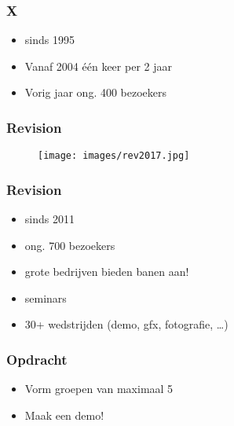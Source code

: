 \documentclass[aspectratio=43]{uva-inf-presentation}
\begin{document}

\begin{frame}
\frametitle{X}

\begin{itemize}
\item sinds 1995
\item Vanaf 2004 \'e\'en keer per 2 jaar
\item Vorig jaar ong. 400 bezoekers
\end{itemize}

\end{frame}


\begin{frame}
\frametitle{Revision}

\begin{figure}
\texttt{[image: images/rev2017.jpg]}
\end{figure}

\end{frame}


\begin{frame}
\frametitle{Revision}

\begin{itemize}
\item sinds 2011
\item ong. 700 bezoekers
\item grote bedrijven bieden banen aan!
\item seminars
\item 30+ wedstrijden (demo, gfx, fotografie, \dots)
\end{itemize}

\end{frame}


\begin{frame}
\frametitle{Opdracht}

\begin{itemize}
\item Vorm groepen van maximaal 5
\item Maak een demo!
\end{itemize}

\end{frame}
\end{document}
